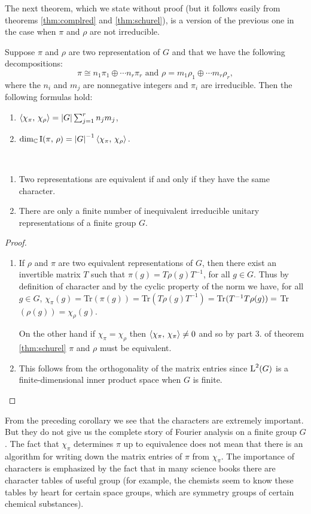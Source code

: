 The next theorem, which we state without proof (but it follows easily from theorems \ref{thm:complred} and \ref{thm:schurel}), is a version of the previous one in the case when $\pi$ and $\rho$ are not irreducible.
\begin{theorem}
\label{thm:non_irreducible_rel}
Suppose $\pi$ and $\rho$ are two representation of $G$ and that we have the following decompositions:
\[
\pi\cong n_1\pi_1\oplus\cdots n_r\pi_r\text{ and $\rho=m_1\rho_1\oplus\cdots m_r\rho_r,$}
\]
where the $n_i$ and $m_j$ are nonnegative integers and $\pi_i$ are irreducible. Then the following formulas hold:
\begin{enumerate}
\item $\braket{\chi_\pi,\, \chi_\rho}=\lvert G\rvert \sum_{j=1}^rn_jm_j$,
\item $ \dim_{\mathbb C}\operatorname{I}(\pi, \, \rho)={\lvert G\rvert}^{-1}\braket{\chi_\pi,\, \chi_\rho}.$
\end{enumerate}
\end{theorem}
\begin{cor}~ 
\begin{enumerate}
\item Two representations are equivalent if and only if they have the same character.
\item There are only a finite number of inequivalent irreducible unitary representations of a finite group $G$.
\end{enumerate}
\end{cor}
\begin{proof}~
\begin{enumerate}
\item If $\rho$ and $\pi$ are two equivalent representations of $G$, then there exist  an invertible matrix $T$ such that $\pi(g)=T\rho(g)T^{-1}$, for all $g\in G$. Thus by definition of character and by the cyclic property of the norm we have, for all $g\in G$, $\chi_\pi(g)=$Tr$(\pi(g))=$Tr$(T\rho(g)T^{-1})=$Tr$(T^{-1}T\rho(g))= \\
$Tr$(\rho(g))=\chi_\rho(g)$.

On the other hand if $\chi_\pi=\chi_\rho$ then $\braket{\chi_\pi,\, \chi_\pi} \neq 0$ and so by part 3. of theorem \ref{thm:schurel} $\pi$ and $\rho$ must be equivalent.
\item  This  follows  from  the orthogonality  of  the matrix  entries  since $\operatorname{L}^{2}(G)$ is a finite-dimensional inner product  space when $G$ is finite.
\end{enumerate}

\end{proof}
From the preceding corollary we see that the characters are extremely important. But they do not give us the complete  story  of Fourier  analysis on a finite
group $G$. The fact that $\chi_\pi$ determines $\pi$ up to equivalence does not mean that there is an algorithm for writing down the matrix entries  of $\pi$ from $\chi_\pi$.
The importance of characters is emphasized by the fact that in many science books there are character tables of useful group (for example, the  chemists  seem  to  know  these  tables  by heart for certain space groups, which are symmetry groups of certain chemical substances).

